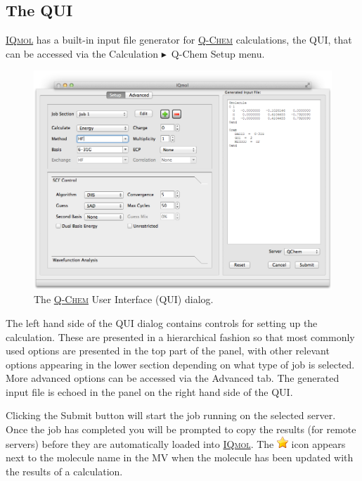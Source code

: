 \documentclass[a4paper,12pt]{article}
\newcommand{\qchem}{\href{https://q-chem.com}{{\scshape Q-Chem}}}
\newcommand{\iqmol}{\href{https://www.iqmol.org}{{\scshape IQmol}}}
\newcommand{\bt}{\ensuremath{\blacktriangleright}}
\begin{document}
\subsection{The QUI}

\iqmol{} has a built-in input file generator for \qchem{} calculations, the
QUI, that can be accessed via the Calculation \bt\  Q-Chem Setup menu.  
\begin{figure}[h]
\begin{center}
\includegraphics[scale=0.4]{figures/QUI.png}
\caption{The \qchem{} User Interface (QUI) dialog.}
\end{center}
\end{figure}

The left hand side of the QUI dialog contains controls for setting up the
calculation.  These are presented in a hierarchical fashion so that most
commonly used options are presented in the top part of the panel, with other
relevant options appearing in the lower section depending on what type of job
is selected.  More advanced options can be accessed via the Advanced tab.  The
generated input file is echoed in the panel on the right hand side of the QUI.

Clicking the Submit button will start the job running on the selected server.
Once the job has completed you will be prompted to copy the results (for remote
servers) before they are automatically loaded into \iqmol{}.  The
\includegraphics[scale=0.6]{figures/Favourites.png} icon appears next to the
molecule name in the MV when the molecule has been updated with the
results of a calculation.
\end{document}
